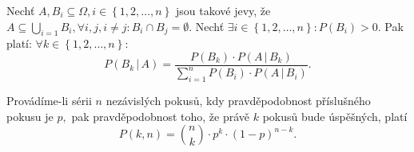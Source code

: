 \begin{veta}
    Nechť $A,B_i \subseteq \Omega, i \in \left \{ 1, 2, \dots, n \right \} $ jsou
    takové jevy, že $A\subseteq \bigcup_{i=1} B_i, \forall i,j, i\ne j: B_i\cap B_j=
    \emptyset.$ Nechť $\exists i \in \left \{ 1, 2, \dots, n \right \} : P(B_i) >0.$
    Pak platí: $\forall k\in \left \{ 1, 2, \dots, n \right \}:$
    $$P(B_k \, |\, A)=\frac{P(B_k)\cdot P(A\, |\, B_k)}{\sum_{i=1}^n P(B_i)\cdot
    P(A\, |\, B_i)}. $$
\end{veta}

\begin{veta}
    Provádíme-li sérii $n$ nezávislých pokusů, kdy pravděpodobnost příslušného
    pokusu je $p,$ pak pravděpodobnost toho, že právě $k$ pokusů bude úspěšných, platí
    $$P(k,n)=\binom{n}{k}\cdot p^k \cdot (1-p)^{n-k}.$$
\end{veta}
